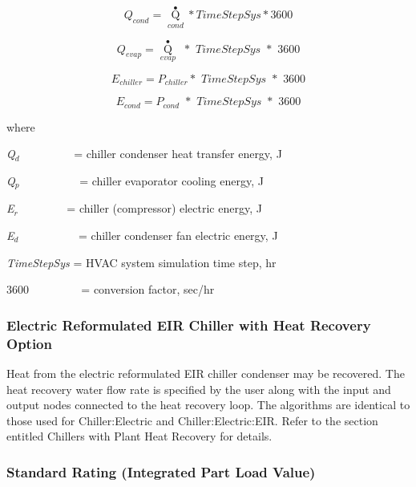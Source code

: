 \begin{equation}
{Q_{cond}} = {\mathop Q\limits^ \bullet_{cond}}*TimeStepSys*3600
\end{equation}

\begin{equation}
{Q_{evap}} = {\mathop Q\limits^ \bullet_{evap}}\,\,*\,\,TimeStepSys\,\,*\,\,3600
\end{equation}

\begin{equation}
{E_{chiller}} = {P_{chiller}}*\,\,TimeStepSys\,\,*\,\,3600
\end{equation}

\begin{equation}
{E_{cond}} = {P_{cond}}\,\, * \,\,TimeStepSys\,\,*\,\,3600
\end{equation}

where

\emph{Q\(_{d}\)}~~~~~~~~~ = chiller condenser heat transfer energy, J

\emph{Q\(_{p}\)}~~~~~~~~~~ = chiller evaporator cooling energy, J

\emph{E\(_{r}\)}~~~~~~~~ = chiller (compressor) electric energy, J

\emph{E\(_{d}\)}~~~~~~~~~~ = chiller condenser fan electric energy, J

\emph{TimeStepSys} = HVAC system simulation time step, hr

\(3600\) ~~~~~~~~ = conversion factor, sec/hr

\subsubsection{Electric Reformulated EIR Chiller with Heat Recovery Option}\label{electric-reformulated-eir-chiller-with-heat-recovery-option}

Heat from the electric reformulated EIR chiller condenser may be recovered. The heat recovery water flow rate is specified by the user along with the input and output nodes connected to the heat recovery loop. The algorithms are identical to those used for Chiller:Electric and Chiller:Electric:EIR. Refer to the section entitled Chillers with Plant Heat Recovery for details.

\subsubsection{Standard Rating (Integrated Part Load Value)}\label{standard-rating-integrated-part-load-value-1}

